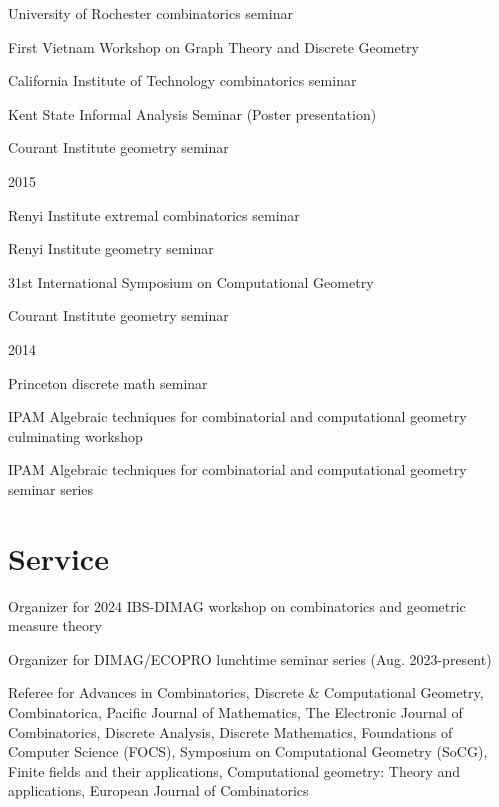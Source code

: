 \documentclass[letterpaper]{article}
\renewenvironment{itemize}{
  \begin{list}{}{
    \setlength{\leftmargin}{1.5em}
  }
}{
  \end{list}
}
\begin{document}
\begin{itemize}
\begin{itemize}
\item University of Rochester combinatorics seminar
\item First Vietnam Workshop on Graph Theory and Discrete Geometry
\item California Institute of Technology combinatorics seminar
\item Kent State Informal Analysis Seminar (Poster presentation)
\item Courant Institute geometry seminar
\end{itemize}
\item 2015
\begin{itemize}
\item Renyi Institute extremal combinatorics seminar
\item Renyi Institute geometry seminar
\item 31st International Symposium on Computational Geometry
\item Courant Institute geometry seminar
\end{itemize}
\item 2014
\begin{itemize}
\item Princeton discrete math seminar
\item IPAM Algebraic techniques for combinatorial and computational geometry culminating workshop
\item IPAM Algebraic techniques for combinatorial and computational geometry seminar series
\end{itemize}
\end{itemize}

\section*{Service}
\begin{itemize}
\item Organizer for 2024 IBS-DIMAG workshop on combinatorics and geometric measure theory
\item Organizer for DIMAG/ECOPRO lunchtime seminar series (Aug. 2023-present)
\item Referee for Advances in Combinatorics, Discrete \& Computational Geometry, Combinatorica, Pacific Journal of Mathematics, The Electronic Journal of Combinatorics, Discrete Analysis, Discrete Mathematics, Foundations of Computer Science (FOCS), Symposium on Computational Geometry (SoCG), Finite fields and their applications, Computational geometry: Theory and applications, European Journal of Combinatorics
\end{itemize}
\end{document}
